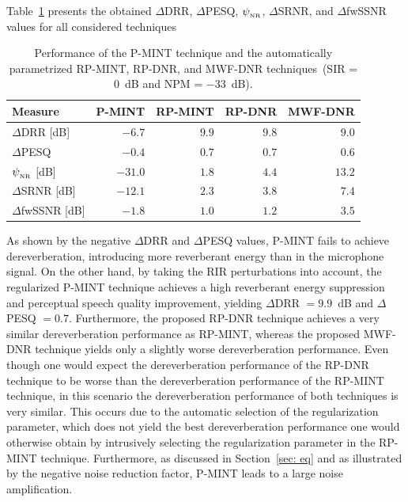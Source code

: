 \documentclass[draftcls,onecolumn,11pt]{IEEEtran}
\begin{document}
Table~\ref{tbl: perf} presents the obtained $\Delta$DRR, $\Delta$PESQ, $\psi_{_{\rm NR}}$, $\Delta$SRNR, and $\Delta$fwSSNR values for all considered techniques
\begin{table}[t!]
\begin{center}
  \caption{Performance of the P-MINT technique and the automatically parametrized RP-MINT, RP-DNR, and MWF-DNR techniques~(SIR = $0$~dB and NPM = $-33$~dB).}
  \label{tbl: perf}
  \begin{tabularx}{\linewidth}{Xrrrr}
    \toprule
      Measure & P-MINT & RP-MINT & RP-DNR & MWF-DNR \\
      \midrule
      $\Delta$DRR [dB] & $-6.7$ & $\mathbf{9.9}$ & $9.8$ & $9.0$ \\
      $\Delta$PESQ & $-0.4$ & $\mathbf{0.7}$ & $\mathbf{0.7}$ & $0.6$ \\
      $\psi_{_{\rm NR}} $ [dB] & $-31.0$ & $1.8$ & $4.4$ & $\mathbf{13.2}$ \\
      $\Delta$SRNR [dB] & $-12.1$ & $2.3$ & $3.8$ & $\mathbf{7.4}$ \\
      $\Delta$fwSSNR [dB] & $-1.8$ & $1.0$ & $1.2$ & $\mathbf{3.5}$ \\
    \bottomrule
  \end{tabularx}
\end{center}
\end{table}
As shown by the negative $\Delta$DRR and $\Delta$PESQ values, P-MINT fails to achieve dereverberation, introducing more reverberant energy than in the microphone signal.
On the other hand, by taking the RIR perturbations into account, the regularized P-MINT technique achieves a high reverberant energy suppression and perceptual speech quality improvement, yielding $\Delta$DRR $= 9.9$~dB and $\Delta$PESQ $=0.7$.
Furthermore, the proposed RP-DNR technique achieves a very similar dereverberation performance as RP-MINT, whereas the proposed MWF-DNR technique yields only a slightly worse dereverberation performance. 
Even though one would expect the dereverberation performance of the RP-DNR technique to be worse than the dereverberation performance of the RP-MINT technique, in this scenario the dereverberation performance of both techniques is very similar. 
This occurs due to the automatic selection of the regularization parameter, which does not yield the best dereverberation performance one would otherwise obtain by intrusively selecting the regularization parameter in the RP-MINT technique.
Furthermore, as discussed in Section~\ref{sec: eq} and as illustrated by the negative noise reduction factor, P-MINT leads to a large noise amplification.
\end{document}
